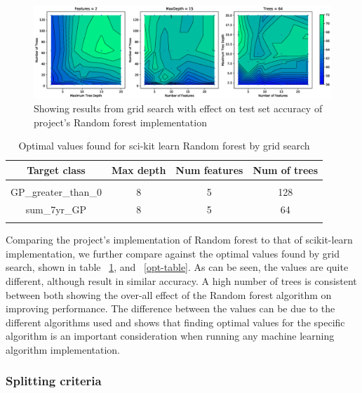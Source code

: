 \documentclass{article} %
\begin{document}
\begin{figure}[ht]
\includegraphics[width=1.1\textwidth]{gridSClass}
\caption{Showing results from grid search with effect on test set accuracy of project's Random forest implementation}
\label{fig:gridSClass}
\end{figure}

\begin{table}[h]
\caption{Optimal values found for sci-kit learn Random forest by grid search}
\begin{center}
\begin{tabular}{cccc}
{\bf Target class} &{\bf Max depth} &{\bf Num features} &{\bf Num of trees}
\\ \hline \\
GP\_greater\_than\_0         &8	&5 &128 \\
sum\_7yr\_GP         &8	&5 &64 \\
\label{scikit-table}
\end{tabular}
\end{center}
\end{table}

Comparing the project's implementation of Random forest to that of scikit-learn implementation, we further compare against the optimal values found by grid search, shown in table ~\ref{scikit-table}, and ~\ref{opt-table}. As can be seen, the values are quite different, although result in similar accuracy. A high number of trees is consistent between both showing the over-all effect of the Random forest algorithm on improving performance. The difference between the values can be due to the different algorithms used and shows that finding optimal values for the specific algorithm is an important consideration when running any machine learning algorithm implementation. 

\subsubsection{Splitting criteria}
\end{document}
